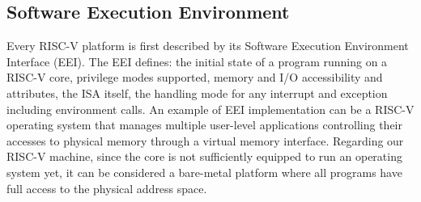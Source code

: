 \subsection{Software Execution Environment}
Every RISC-V platform is first described by its Software Execution Environment Interface (EEI). The EEI defines: the initial state of a program running on a RISC-V core, privilege modes supported, memory and I/O accessibility and attributes, the ISA itself, the handling mode for any interrupt and exception including environment calls.
An example of EEI implementation can be a RISC-V operating system that manages multiple user-level applications controlling their accesses to physical memory through a virtual memory interface.
Regarding our RISC-V machine, since the core is not sufficiently equipped to run an operating system yet, it can be considered a bare-metal platform where all programs have full access to the physical address space.

